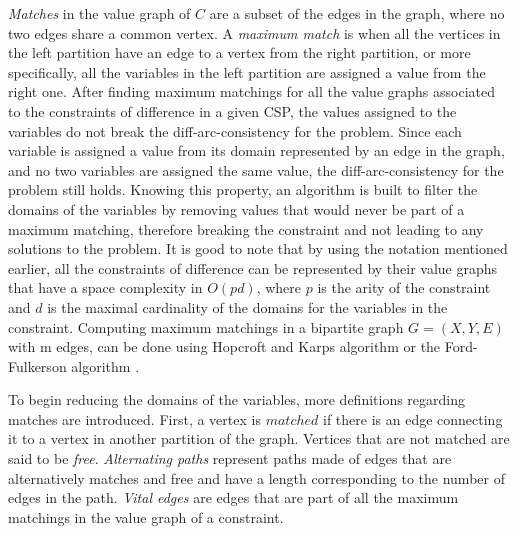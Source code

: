 \documentclass{l4proj}
\begin{document}
\noindent \textit{Matches} in the value graph of $C$ are a subset of the edges in the graph, where no two edges share a common vertex. A \textit{maximum match} is when all the vertices in the left partition have an edge to a vertex from the right partition, or more specifically, all the variables in the left partition are assigned a value from the right one.
After finding maximum matchings for all the value graphs associated to the constraints of difference in a given CSP, the values assigned to the variables do not break the diff-arc-consistency for the problem. Since each variable is assigned a value from its domain represented by an edge in the graph, and no two variables are assigned the same value, the diff-arc-consistency for the problem still holds. Knowing this property, an algorithm is built to filter the domains of the variables by removing values that would never be part of a maximum matching, therefore breaking the constraint and not leading to any solutions to the problem. It is good to note that by using the notation mentioned earlier, all the constraints of difference can be represented by their value graphs that have a space complexity in $O(pd)$, where $p$ is the arity of the constraint and $d$ is the maximal cardinality of the domains for the variables in the constraint. Computing maximum matchings in a bipartite graph $G = (X, Y, E)$ with m edges, can be done using Hopcroft and Karp\textquotesingle s algorithm \cite{hopcroft1973n} or the Ford-Fulkerson algorithm \cite{ford1956maximal}. 

\noindent To begin reducing the domains of the variables, more definitions regarding matches are introduced. First, a vertex is $matched$ if there is an edge connecting it to a vertex in another partition of the graph. Vertices that are not matched are said to be \textit{free}. \textit{Alternating paths} represent paths made of edges that are alternatively matches and free and have a length corresponding to the number of edges in the path. \textit{Vital edges} are edges that are part of all the maximum matchings in the value graph of a constraint.
\end{document}
